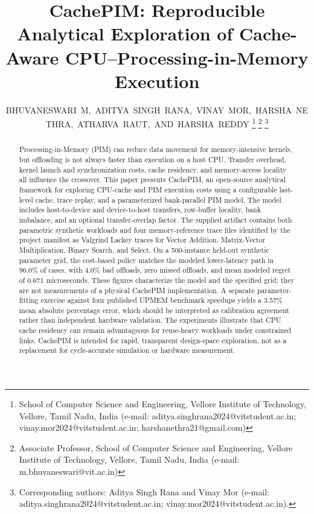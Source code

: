 \documentclass[journal,10pt,twocolumn]{IEEEtran}
\begin{document}
\title{CachePIM: Reproducible Analytical Exploration of Cache-Aware CPU--Processing-in-Memory Execution}

\author{BHUVANESWARI~M,~ADITYA~SINGH~RANA,~VINAY~MOR,~HARSHA~NETHRA,~ATHARVA~RAUT,~AND~HARSHA~REDDY%
\thanks{School of Computer Science and Engineering, Vellore Institute of Technology, Vellore, Tamil Nadu, India (e-mail: aditya.singhrana2024@vitstudent.ac.in; vinay.mor2024@vitstudent.ac.in; harshanethra21@gmail.com)}%
\thanks{Associate Professor, School of Computer Science and Engineering, Vellore Institute of Technology, Vellore, Tamil Nadu, India (e-mail: m.bhuvaneswari@vit.ac.in)}%
\thanks{Corresponding authors: Aditya Singh Rana and Vinay Mor (e-mail: aditya.singhrana2024@vitstudent.ac.in; vinay.mor2024@vitstudent.ac.in).}%
}


\maketitle

\begin{abstract}
Processing-in-Memory (PIM) can reduce data movement for memory-intensive kernels, but offloading is not always faster than execution on a host CPU. Transfer overhead, kernel launch and synchronization costs, cache residency, and memory-access locality all influence the crossover. This paper presents CachePIM, an open-source analytical framework for exploring CPU-cache and PIM execution costs using a configurable last-level cache, trace replay, and a parameterized bank-parallel PIM model. The model includes host-to-device and device-to-host transfers, row-buffer locality, bank imbalance, and an optional transfer-overlap factor. The supplied artifact contains both parametric synthetic workloads and four memory-reference trace files identified by the project manifest as Valgrind Lackey traces for Vector Addition, Matrix-Vector Multiplication, Binary Search, and Select. On a 500-instance held-out synthetic parameter grid, the cost-based policy matches the modeled lower-latency path in 96.0\% of cases, with 4.0\% bad offloads, zero missed offloads, and mean modeled regret of 0.671 microseconds. These figures characterize the model and the specified grid; they are not measurements of a physical CachePIM implementation. A separate parameter-fitting exercise against four published UPMEM benchmark speedups yields a 3.57\% mean absolute percentage error, which should be interpreted as calibration agreement rather than independent hardware validation. The experiments illustrate that CPU cache residency can remain advantageous for reuse-heavy workloads under constrained links. CachePIM is intended for rapid, transparent design-space exploration, not as a replacement for cycle-accurate simulation or hardware measurement.
\end{abstract}
\end{document}
